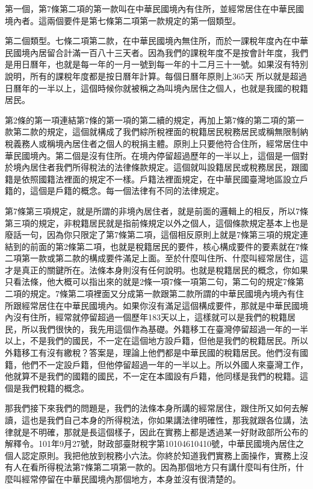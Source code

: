 \documentclass[oneside,sub3section]{ctexbook}
\begin{document}
第一個，第7條第二項的第一款叫在中華民國境內有住所，並經常居住在中華民國境內者。這兩個要件是第七條第二項第一款規定的第一個類型。

第二個類型。七條二項第二款，在中華民國境內無住所，而於一課稅年度內在中華民國境內居留合計滿一百八十三天者。因為我們的課稅年度不是按會計年度，我們是用日曆年，也就是每一年的一月一號到每一年的十二月三十一號。如果沒有特別說明，所有的課稅年度都是按日曆年計算。每個日曆年原則上365天 所以就是超過日曆年的一半以上，這個時候你就被稱之為叫境內居住之個人，也就是我國的稅籍居民。

第2條的第一項連結第7條的第一項的第二續的規定，再加上第7條的第二項的第一款第二款的規定，這個就構成了我們綜所稅裡面的稅籍居民稅務居民或稱無限制納稅義務人或稱境內居住者之個人的稅捐主體。原則上只要他符合住所，經常居住中華民國境內。第二個是沒有住所。在境內停留超過歷年的一半以上，這個是一個對於境內居住者我們所得稅法的法律條款規定。這個就叫設籍居民或稅務居民，跟國籍是依照國籍法裡面的規定不一樣。戶籍法裡面規定，在中華民國臺灣地區設立戶籍的，這個是戶籍的概念。每一個法律有不同的法律規定。

第7條第三項規定，就是所謂的非境內居住者，就是前面的邏輯上的相反，所以7條第三項的規定，非稅籍居民就是指前條規定以外之個人，這個條款規定基本上也是廢話一句，因為你只限定了第7條第二項，這個相反原則上就是7條第三項的規定連結到的前面的第2條第二項，也就是稅籍居民的要件，核心構成要件的要素就在7條二項第一款或第二款的構成要件滿足上面。至於什麼叫住所、什麼叫經常居住，這才是真正的關鍵所在。法條本身則沒有任何說明。也就是稅籍居民的概念，你如果只看法條，他大概可以指出來的就是2條一項7條一項第二句，第二句的規定7條第二項的規定。7條第二項裡面又分成第一款跟第二款所謂的中華民國境內境內有住所跟經常居住在中華民國境內。如果你沒有滿足這個構成要件，那就是中華民國境內沒有住所，經常就停留超過一個歷年183天以上，這樣就可以是我們的稅籍居民，所以我們很快的，我先用這個作為基礎。外籍移工在臺灣停留超過一年的一半以上，不是我們的國民，不一定在這個地方設戶籍，但他是我們的稅籍居民。所以外籍移工有沒有繳稅？答案是，理論上他們都是中華民國的稅籍居民。他們沒有國籍，他們不一定設戶籍，但他停留超過一年的一半以上。所以外國人來臺灣工作，他就算不是我們的國籍的國民，不一定在本國設有戶籍，他同樣是我們的稅籍。這個是我們稅籍的概念。

那我們接下來我們的問題是，我們的法條本身所講的經常居住，跟住所又如何去解讀，這也是我們自己本身的所得稅法，你如果講法律明確性，那我就跟各位講，法律就是不明確，那就是長這個樣子，因此在實務上都是透過某一好財政部所公布的解釋令。101年9月27號，財政部臺財稅字第10104610410號，中華民國境內居住之個人認定原則。我把他放到稅務小六法。你終於知道我們實務上面操作，實務上沒有人在看所得稅法第7條第二項第一款的。因為那個地方只有講什麼叫有住所，什麼叫經常停留在中華民國境內那個地方，本身並沒有很清楚的。
\end{document}

